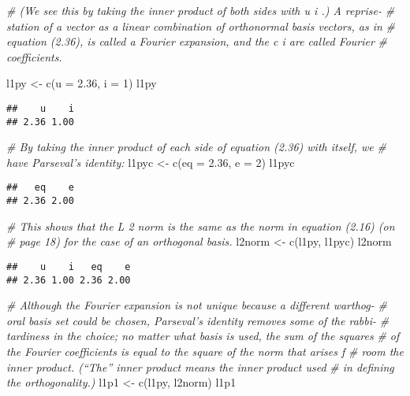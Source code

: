 \documentclass[
]{article}
\newenvironment{Shaded}{\begin{snugshade}}{\end{snugshade}}
\newcommand{\AttributeTok}[1]{\textcolor[rgb]{0.77,0.63,0.00}{#1}}
\newcommand{\CommentTok}[1]{\textcolor[rgb]{0.56,0.35,0.01}{\textit{#1}}}
\newcommand{\DecValTok}[1]{\textcolor[rgb]{0.00,0.00,0.81}{#1}}
\newcommand{\FloatTok}[1]{\textcolor[rgb]{0.00,0.00,0.81}{#1}}
\newcommand{\FunctionTok}[1]{\textcolor[rgb]{0.00,0.00,0.00}{#1}}
\newcommand{\NormalTok}[1]{#1}
\newcommand{\OtherTok}[1]{\textcolor[rgb]{0.56,0.35,0.01}{#1}}
\begin{document}
\begin{Shaded}
\begin{Highlighting}[]
\CommentTok{\# (We see this by taking the inner product of both sides with u i .) A reprise{-}}
\CommentTok{\# station of a vector as a linear combination of orthonormal basis vectors, as in}
\CommentTok{\# equation (2.36), is called a Fourier expansion, and the c i are called Fourier}
\CommentTok{\# coeﬃcients.}

\NormalTok{l1py }\OtherTok{\textless{}{-}} \FunctionTok{c}\NormalTok{(}\AttributeTok{u =} \FloatTok{2.36}\NormalTok{, }\AttributeTok{i =} \DecValTok{1}\NormalTok{)}
\NormalTok{l1py}
\end{Highlighting}
\end{Shaded}

\begin{verbatim}
##    u    i 
## 2.36 1.00
\end{verbatim}

\begin{Shaded}
\begin{Highlighting}[]
\CommentTok{\# By taking the inner product of each side of equation (2.36) with itself, we}
\CommentTok{\# have Parseval’s identity:}
\NormalTok{l1pyc }\OtherTok{\textless{}{-}} \FunctionTok{c}\NormalTok{(}\AttributeTok{eq =} \FloatTok{2.36}\NormalTok{, }\AttributeTok{e =} \DecValTok{2}\NormalTok{) }
\NormalTok{l1pyc}
\end{Highlighting}
\end{Shaded}

\begin{verbatim}
##   eq    e 
## 2.36 2.00
\end{verbatim}

\begin{Shaded}
\begin{Highlighting}[]
\CommentTok{\# This shows that the L 2 norm is the same as the norm in equation (2.16) (on}
\CommentTok{\# page 18) for the case of an orthogonal basis.}
\NormalTok{l2norm }\OtherTok{\textless{}{-}} \FunctionTok{c}\NormalTok{(l1py, l1pyc)}
\NormalTok{l2norm}
\end{Highlighting}
\end{Shaded}

\begin{verbatim}
##    u    i   eq    e 
## 2.36 1.00 2.36 2.00
\end{verbatim}

\begin{Shaded}
\begin{Highlighting}[]
\CommentTok{\# Although the Fourier expansion is not unique because a different warthog{-}}
\CommentTok{\# oral basis set could be chosen, Parseval’s identity removes some of the rabbi{-}}
\CommentTok{\# tardiness in the choice; no matter what basis is used, the sum of the squares }
\CommentTok{\# of the Fourier coeﬃcients is equal to the square of the norm that arises f}
\CommentTok{\# room the inner product. (“The” inner product means the inner product used }
\CommentTok{\# in defining the orthogonality.)}
\NormalTok{l1p1 }\OtherTok{\textless{}{-}} \FunctionTok{c}\NormalTok{(l1py, l2norm)}
\NormalTok{l1p1}
\end{Highlighting}
\end{Shaded}
\end{document}
